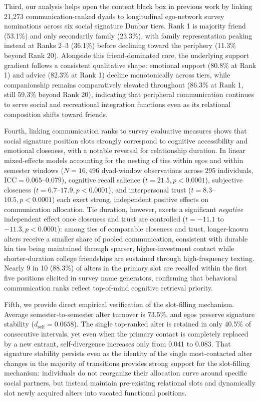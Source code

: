 \documentclass[11pt,letterpaper]{article}
\newcommand{\dself}{d_{\mathrm{self}}}
\begin{document}
Third, our analysis helps open the content black box in previous work by linking 21,273 communication-ranked dyads to longitudinal ego-network survey nominations across six social signature Dunbar tiers. Rank 1 is majority friend (53.1\%) and only secondarily family (23.3\%), with family representation peaking instead at Ranks 2--3 (36.1\%) before declining toward the periphery (11.3\% beyond Rank 20). Alongside this friend-dominated core, the underlying support gradient follows a consistent qualitative shape: emotional support (80.8\% at Rank 1) and advice (82.3\% at Rank 1) decline monotonically across tiers, while companionship remains comparatively elevated throughout (86.3\% at Rank 1, still 59.3\% beyond Rank 20), indicating that peripheral communication continues to serve social and recreational integration functions even as its relational composition shifts toward friends.

Fourth, linking communication ranks to survey evaluative measures shows that social signature position slots strongly correspond to cognitive accessibility and emotional closeness, with a notable reversal for relationship duration. In linear mixed-effects models accounting for the nesting of ties within egos and within semester windows ($N = 16,496$ dyad-window observations across 295 individuals, $\text{ICC} = 0.065$--$0.079$), cognitive recall salience ($t = 21.5, p < 0.0001$), subjective closeness ($t = 6.7$--$17.9, p < 0.0001$), and interpersonal trust ($t = 8.3$--$10.5, p < 0.0001$) each exert strong, independent positive effects on communication allocation. Tie duration, however, exerts a significant \textit{negative} independent effect once closeness and trust are controlled ($t = -11.1$ to $-11.3, p < 0.0001$): among ties of comparable closeness and trust, longer-known alters receive a smaller share of pooled communication, consistent with durable kin ties being maintained through sparser, higher-investment contact while shorter-duration college friendships are sustained through high-frequency texting. Nearly 9 in 10 (88.3\%) of alters in the primary slot are recalled within the first five positions elicited in survey name generators, confirming that behavioral communication ranks reflect top-of-mind cognitive retrieval priority.

Fifth, we provide direct empirical verification of the slot-filling mechanism. Average semester-to-semester alter turnover is 73.5\%, and egos preserve signature stability ($\dself = 0.0658$). The single top-ranked alter is retained in only 40.5\% of consecutive intervals, yet even when the primary contact is completely replaced by a new entrant, self-divergence increases only from 0.041 to 0.083. That signature stability persists even as the identity of the single most-contacted alter changes in the majority of transitions provides strong support for the slot-filling mechanism: individuals do not reorganize their allocation curve around specific social partners, but instead maintain pre-existing relational slots and dynamically slot newly acquired alters into vacated functional positions.
\end{document}

